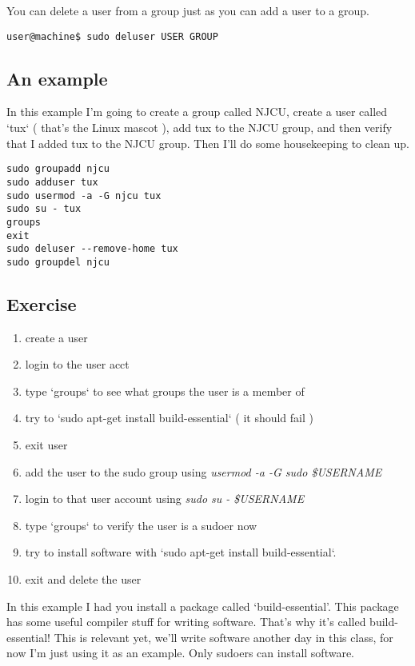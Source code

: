\documentclass[10pt]{article}
\begin{document}
You can delete a user from a group just as you can add a user to a group.

\begin{lstlisting}[style=term]
user@machine$ sudo deluser USER GROUP
\end{lstlisting}

\subsection{ An example }
 In this example I'm going to create a group called NJCU, create a user called `tux` ( that's the Linux mascot ), add tux to the NJCU group, and then verify that I added tux to the NJCU group. Then I'll do some housekeeping to clean up.

\begin{lstlisting}[style=term]
sudo groupadd njcu
sudo adduser tux
sudo usermod -a -G njcu tux
sudo su - tux
groups
exit
sudo deluser --remove-home tux
sudo groupdel njcu
\end{lstlisting}

\subsection{{\color{red}Exercise}}
\begin{enumerate}
\item create a user
\item login to the user acct
\item type `groups` to see what groups the user is a member of
\item try to `sudo apt-get install build-essential` ( it should fail )
\item exit user
\item add the user to the sudo group using \textit{usermod -a -G sudo
\$USERNAME}
\item login to that user account using \textit{sudo su - \$USERNAME}
\item type `groups` to verify the user is a sudoer now
\item try to install software with `sudo apt-get install build-essential`.
\item exit and delete the user
\end{enumerate}

In this example I had you install a package called `build-essential'. This
package has some useful compiler stuff for writing software. That's why it's
called build-essential! This is relevant yet, we'll write software another day
in this class, for now I'm just using it as an example. Only sudoers can install
software.
\end{document}
